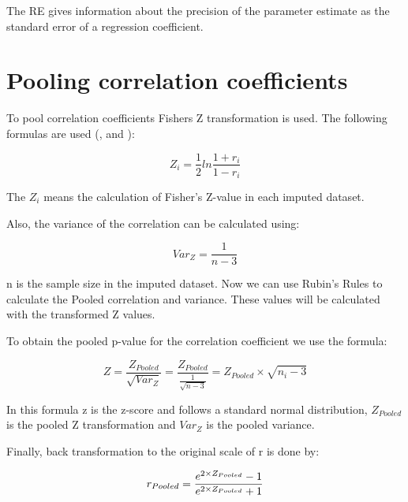 \documentclass[
]{book}
\begin{document}
The RE gives information about the precision of the parameter estimate as the standard error of a regression coefficient.

\hypertarget{pooling-correlation-coefficients}{%
\chapter{Pooling correlation coefficients}\label{pooling-correlation-coefficients}}

To pool correlation coefficients Fishers Z transformation is used. The following formulas are used (\citet{raghunathan2016}, \citet{VanBuuren2018} and \citet{enders2010applied}):

\begin{equation}
Z_i = \frac{1}{2}ln\frac{1+r_i}{1-r_i}
  \label{eq:cor}
\end{equation}

The \({Z_i}\) means the calculation of Fisher's Z-value in each imputed dataset.

Also, the variance of the correlation can be calculated using:

\begin{equation}
Var_Z=\frac{1}{n-3}
  \label{eq:var-cor}
\end{equation}

n is the sample size in the imputed dataset. Now we can use Rubin's Rules to calculate the Pooled correlation and variance. These values will be calculated with the transformed Z values.

To obtain the pooled p-value for the correlation coefficient we use the formula:

\begin{equation}
Z=\frac{Z_{Pooled}}{\sqrt{Var_Z}} = \frac{Z_{Pooled}}{\frac{1}{\sqrt{n-3}}}=Z_{Pooled}\times\sqrt{n_i-3}
  \label{eq:z-cor}
\end{equation}

In this formula z is the z-score and follows a standard normal distribution, \(Z_{Pooled}\) is the pooled Z transformation and \(Var_Z\) is the pooled variance.

Finally, back transformation to the original scale of r is done by:

\begin{equation}
r_{Pooled} = \frac{e^{2\times\\Z_{Pooled}}-1}{e^{2\times\\Z_{Pooled}}+1}
  \label{eq:exp-cor}
\end{equation}
\end{document}
